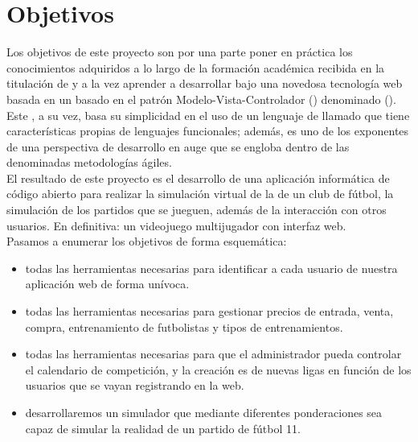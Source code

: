 

\section{Objetivos}

Los objetivos de este proyecto son por una parte poner en práctica los
conocimientos adquiridos a lo largo de la formación académica recibida
en la titulación de  y a la vez aprender a desarrollar bajo una novedosa tecnología web
basada en un  basado en el patrón
Modelo-Vista-Controlador () denominado  ().\\

Este , a su vez, basa su simplicidad en el uso de un
lenguaje de  llamado  que tiene
características propias de lenguajes funcionales; además, es uno de
los exponentes de una perspectiva de desarrollo en auge que se engloba
dentro de las denominadas metodologías ágiles.\\

El resultado de este proyecto es el desarrollo de una aplicación
informática  de código abierto para realizar la
simulación virtual de la  de un club de
fútbol, la simulación de los partidos que se jueguen, además de la
interacción con otros usuarios. En definitiva: un videojuego
multijugador con interfaz web.\\

Pasamos a enumerar los objetivos de forma esquemática:

\begin{itemize}
  \item {} todas las herramientas
    necesarias para identificar a cada usuario de nuestra aplicación
    web de forma unívoca.
  \item {} todas las herramientas
    necesarias para gestionar precios de entrada, venta, compra,
    entrenamiento de futbolistas y tipos de entrenamientos.
  \item {} todas las herramientas
    necesarias para que el administrador pueda controlar el calendario
    de competición, y la creación es de nuevas ligas en función de los
    usuarios que se vayan registrando en la web.
  \item {} desarrollaremos un
    simulador que mediante diferentes ponderaciones sea capaz de
    simular la realidad de un partido de fútbol 11.
\end{itemize}

